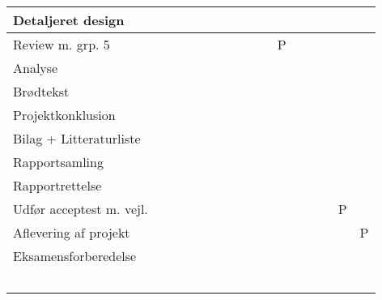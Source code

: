\documentclass[landscape, 12pt, letterpaper]{article}
\begin{document}
\begin{table}[]
\begin{tabular}{|l|l|l|l|l|l|l|l|l|l|l|l|l|l|l|l|}
Detaljeret design       &    &    &    &    &    &    &    &    &    &    &    &    &    &    &    \\ \hline
Review m. grp. 5       &    &    &    &    &    &    &    &    &    &  P  &    &    &    &    &    \\ \hline
Analyse                 &    &    &    &    &    &    &    &    &    &    &    &    &    &    &    \\ \hline
Brødtekst               &    &    &    &    &    &    &    &    &    &    &    &    &    &    &    \\ \hline
Projektkonklusion       &    &    &    &    &    &    &    &    &    &    &    &    &    &    &    \\ \hline
Bilag + Litteraturliste &    &    &    &    &    &    &    &    &    &    &    &    &    &    &    \\ \hline
Rapportsamling          &    &    &    &    &    &    &    &    &    &    &    &    &    &    &    \\ \hline
Rapportrettelse         &    &    &    &    &    &    &    &    &    &    &    &    &    &    &    \\ \hline
Udfør acceptest m. vejl.&    &    &    &    &    &    &    &    &    &    &    &    &    & P   &    \\ \hline
Aflevering af projekt   &    &    &    &    &    &    &    &    &    &    &    &    &    &    &  P   \\ \hline
Eksamensforberedelse    &    &    &    &    &    &    &    &    &    &    &    &    &    &    &    \\ \hline
                        &    &    &    &    &    &    &    &    &    &    &    &    &    &    &    \\ \hline
                        &    &    &    &    &    &    &    &    &    &    &    &    &    &    &    \\ \hline
                        &    &    &    &    &    &    &    &    &    &    &    &    &    &    &    \\ \hline
                        &    &    &    &    &    &    &    &    &    &    &    &    &    &    &     \\ \hline
                        &    &    &    &    &    &    &    &    &    &    &    &    &    &    &    \\ \hline
\end{tabular}
\end{table}
\end{document}
